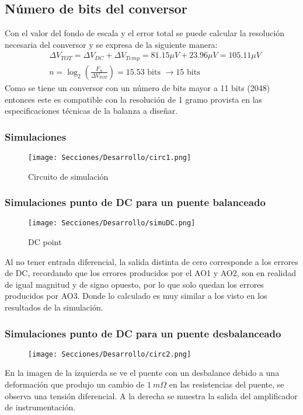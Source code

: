 \subsection{Número de bits del conversor}
Con el valor del fondo de escala y el error total se puede calcular la resolución necesaria del
conversor y se expresa de la siguiente manera: 
\begin{equation*}
    \begin{aligned}
    &\Delta V_{T O T}=\Delta V_{D C}+\Delta V_{T e m p}=81.15 \mu V+23.96 \mu V=105.11 \mu V \\
    &n=\log _2\left(\frac{F_S}{\Delta V_{T O T}}\right)=15.53 \text { bits } \rightarrow 15 \text { bits }
    \end{aligned}
\end{equation*}
Como se tiene un conversor con un número de bits mayor a 11 bits (2048) entonces este es
compatible con la resolución de 1 gramo provista en las especificaciones técnicas de la
balanza a diseñar.
\subsubsection{Simulaciones}

\begin{figure}[H]
    \centering
    \texttt{[image: Secciones/Desarrollo/circ1.png]}
    \caption{Circuito de simulación}
    \label{fig:circ1}
\end{figure}
\subsubsection{Simulaciones punto de DC para un puente balanceado}
\begin{figure}[H]
    \centering
    \texttt{[image: Secciones/Desarrollo/simuDC.png]}
    \caption{DC point}
    \label{fig:simuDC}
\end{figure}
Al no tener entrada diferencial, la salida distinta de cero corresponde a los errores de DC,
recordando que los errores producidos por el AO1 y AO2, son en realidad de igual magnitud y
de signo opuesto, por lo que solo quedan los errores producidos por AO3. Donde lo calculado
es muy similar a los visto en los resultados de la simulación.
\subsubsection{Simulaciones punto de DC para un puente desbalanceado}
\begin{figure}[H]
    \centering
    \texttt{[image: Secciones/Desarrollo/circ2.png]}
    \caption{}
    \label{fig:circ2}
\end{figure}
En la imagen de la izquierda se ve el puente con un desbalance debido a una deformación que
produjo un cambio de $1~m\Omega$ en las resistencias del puente, se observa una tensión diferencial. A la derecha se muestra la salida del amplificador de instrumentación.

